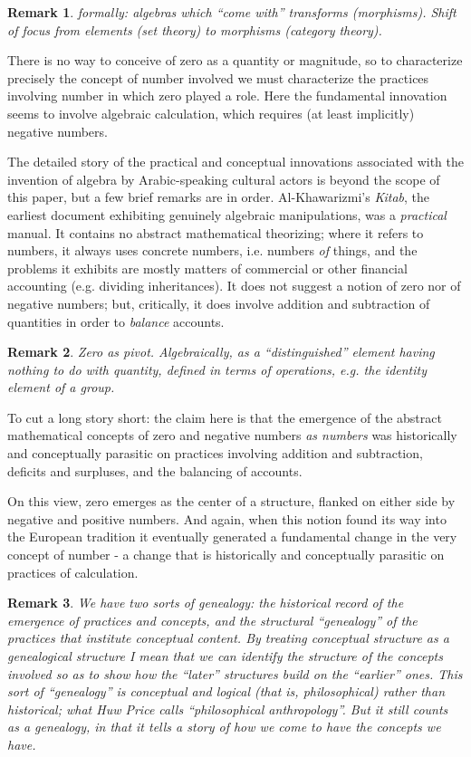 \documentclass[11pt,twoside]{article}
\newtheorem{remark}{Remark}
\begin{document}
\begin{remark}
  formally: algebras which ``come with'' transforms (morphisms).
  Shift of focus from elements (set theory) to morphisms (category
  theory).
\end{remark}

There is no way to conceive of zero as a quantity or magnitude, so to
characterize precisely the concept of number involved we must
characterize the practices involving number in which zero played a
role.  Here the fundamental innovation seems to involve algebraic
calculation, which requires (at least implicitly) negative numbers.

The detailed story of the practical and conceptual innovations
associated with the invention of algebra by Arabic-speaking cultural
actors is beyond the scope of this paper, but a few brief remarks are
in order.  Al-Khawarizmi's \textit{Kitab}, the earliest document
exhibiting genuinely algebraic manipulations, was a \textit{practical}
manual.  It contains no abstract mathematical theorizing; where it
refers to numbers, it always uses concrete numbers, i.e. numbers
\textit{of} things, and the problems it exhibits are mostly matters of
commercial or other financial accounting (e.g. dividing inheritances).
It does not suggest a notion of zero nor of negative numbers; but,
critically, it does involve addition and subtraction of quantities in
order to \textit{balance} accounts.

\begin{remark}
  Zero as pivot.  Algebraically, as a ``distinguished'' element having
  nothing to do with quantity, defined in terms of operations,
  e.g. the identity element of a group.
\end{remark}

To cut a long story short: the claim here is that the emergence of the
abstract mathematical concepts of zero and negative numbers \textit{as
  numbers} was historically and conceptually parasitic on practices
involving addition and subtraction, deficits and surpluses, and the
balancing of accounts.

On this view, zero emerges as the center of a structure, flanked on
either side by negative and positive numbers.  And again, when this
notion found its way into the European tradition it eventually
generated a fundamental change in the very concept of number - a
change that is historically and conceptually parasitic on practices of
calculation.

\begin{remark}
We have two sorts of genealogy: the historical record of the emergence
of practices and concepts, and the structural ``genealogy'' of the
practices that institute conceptual content.  By treating conceptual
structure as a genealogical structure I mean that we can identify the
structure of the concepts involved so as to show how the ``later''
structures build on the ``earlier'' ones.  This sort of ``genealogy''
is conceptual and logical (that is, philosophical) rather than
historical; what Huw Price calls ``philosophical anthropology''.  But
it still counts as a genealogy, in that it tells a story of how we
come to have the concepts we have.
\end{remark}
\end{document}
